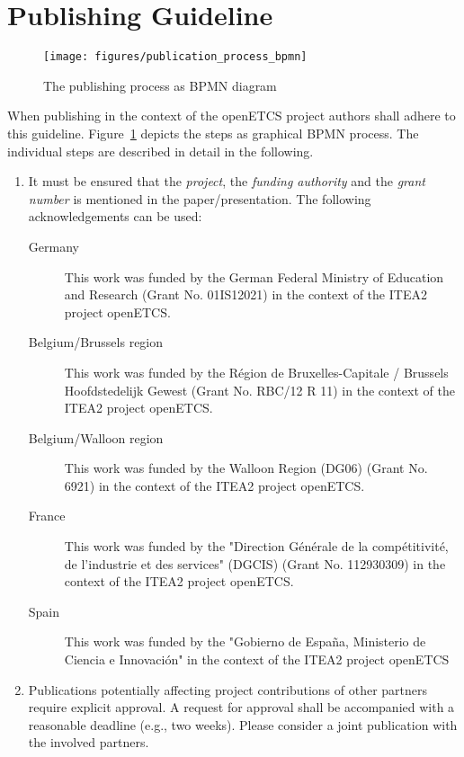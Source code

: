 \documentclass{template/openetcs_article}
\begin{document}
\section{Publishing Guideline}
\label{sct:publishingguideline}

\begin{figure}[H]
\texttt{[image: figures/publication\_process\_bpmn]}
\caption{The publishing process as BPMN diagram}
\label{fig:process}
\end{figure}

When publishing in the context of the openETCS project authors shall adhere to this guideline. Figure~\ref{fig:process} depicts the steps as graphical BPMN process. The individual steps are described in detail in the following.

\begin{enumerate}
  \item  It must be ensured that the \emph{project}, the \emph{funding authority} and the \emph{grant number} is mentioned in the paper/presentation. The following acknowledgements can be used:
  \begin{description}
    \item[Germany] This work was funded by the German Federal Ministry of Education and Research (Grant No. 01IS12021) in the context of the ITEA2 project openETCS.
    \item[Belgium/Brussels region] This work was funded by the Région de Bruxelles-Capitale / Brussels Hoofdstedelijk Gewest (Grant No. RBC/12 R 11) in the context of the ITEA2 project openETCS.
    \item[Belgium/Walloon region] This work was funded by the Walloon Region (DG06) (Grant No. 6921) in the context of the ITEA2 project openETCS.
    \item[France] This work was funded by the "Direction Générale de la compétitivité, de l’industrie et des services" (DGCIS)  (Grant No. 112930309) in the context of the ITEA2 project openETCS.
    \item[Spain] This work was funded by the "Gobierno de España, Ministerio de Ciencia e Innovación" in the context of the ITEA2 project openETCS
  \end{description}

\item Publications potentially affecting project contributions of other partners require explicit approval. A request for approval shall be accompanied with a reasonable deadline (e.g., two weeks). Please consider a joint publication with the involved partners.


\end{enumerate}
\end{document}
